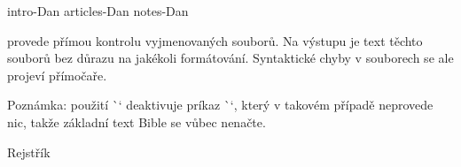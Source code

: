 \begtt
\checksyntax intro-Dan articles-Dan notes-Dan {}
\endtt

provede přímou kontrolu vyjmenovaných souborů. Na výstupu je text těchto
souborů bez důrazu na jakékoli formátování. Syntaktické chyby v souborech se
ale projeví přímočaře.

Poznámka: použití \`\checksyntax` deaktivuje príkaz \`\processbooks`, který v
takovém případě neprovede nic, takže základní text Bible se vůbec nenačte.

\sec Rejstřík

\def\_sortinglang{en}
\typosize[9/]
\makeindex
\endmulti

\bye
